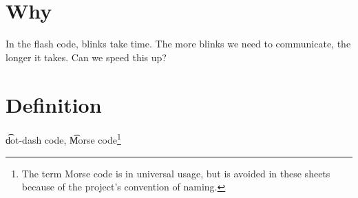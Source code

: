

\section*{Why}

In the flash code, blinks take time.
The more blinks we need to communicate, the longer it takes.
Can we speed this up?

\section*{Definition}

\t{dot-dash code},
\t{Morse code}\footnote{The term Morse code is in universal usage, but is avoided in these sheets because of the project's convention of naming.}

\blankpage